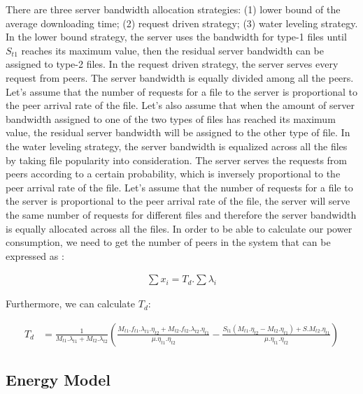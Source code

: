 There are three server bandwidth allocation strategies: (1) lower bound of the average downloading time; (2) request driven strategy; (3) water leveling strategy. 
In the lower bound strategy, the server uses the bandwidth for type-1 files until $S_{t1}$ reaches its maximum value, then the residual server bandwidth can be assigned to type-2 files. 
In the request driven strategy, the server serves every request from peers. 
The server bandwidth is equally divided among all the peers. Let’s assume that the number of requests for a file to the server is proportional to the peer arrival rate of the file. 
Let’s also assume that when the amount of server bandwidth assigned to one of the two types of files has reached its maximum value, the residual server bandwidth will be assigned to the other type of file. 
In the water leveling strategy, the server bandwidth is equalized across all the files by taking file popularity into consideration. 
The server serves the requests from peers according to a certain probability, which is inversely proportional to the peer arrival rate of the file.
Let’s assume that the number of requests for a file to the server is proportional to the peer arrival rate of the file, the server will serve the same number of requests for different files and therefore the server bandwidth is equally allocated across all the files.  
In order to be able to calculate our power consumption, we need to get the number of peers in the system that can be expressed as \cite{Sun:2009:POS:1542245.1542249}:

\begin{equation}\label{eqn:numofpeers}
\begin{split}
\sum x_i = T_d . \sum \lambda_i
\end{split}     
\end{equation} 

Furthermore, we can calculate $T_d$:

\begin{equation}\label{eqn:averagetimedownload}
\begin{split}
T_d &= \frac{1}{M_{t1}.\lambda_{t1} + M_{t2}.\lambda_{t2}}\left(\frac{M_{t1}.f_{t1}.\lambda_{t1}.\eta_{t2} + M_{t2}.f_{t2}.\lambda_{t2}.\eta_{t1}}{\mu.\eta_{t1}.\eta_{t2}} - \frac{S_{t1} (M_{t1}.\eta_{t2}-M_{t2}.\eta_{t1}) + S.M_{t2}.\eta_{t1}}{\mu.\eta_{t1}.\eta_{t2}}\right) 
\end{split}     
\end{equation} 

\subsection{Energy Model}\label{thermodynamics}

